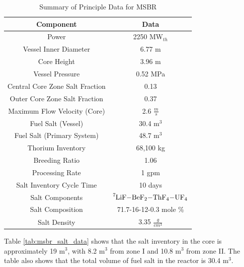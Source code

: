\begin{table}[H]
\renewcommand{\arraystretch}{1.25}
\caption{Summary of Principle Data for MSBR \cite{robertson_conceptual_1971}}
\label{tab:msbr_gen_data}
\begin{center}
\begin{tabular}{ c | c }
 \hline
 Component & Data\\
 \hline
 \hline
 Power & 2250 MW$_{th}$\\
 Vessel Inner Diameter & 6.77 m\\
 Core Height & 3.96 m\\
 Vessel Pressure & 0.52 MPa\\
 Central Core Zone Salt Fraction & 0.13\\
 Outer Core Zone Salt Fraction & 0.37\\
 Maximum Flow Velocity (Core) & 2.6 $\frac{m}{s}$\\
 Fuel Salt (Vessel) & 30.4 m$^3$\\
 Fuel Salt (Primary System) & 48.7 m$^3$\\
 Thorium Inventory & 68,100 kg\\
 Breeding Ratio & 1.06\\
 Processing Rate & 1 gpm\\
 Salt Inventory Cycle Time & 10 days\\
 Salt Components & $\ce{^{7}LiF-BeF_{2}-ThF_{4}-UF_{4}} $\\
 Salt Composition & 71.7-16-12-0.3 mole \% \\
 Salt Density & 3.35 $\frac{g}{cm^3}$\\
 \hline
\end{tabular}
\end{center}
\end{table}

Table \ref{tab:msbr_salt_data} shows that the salt inventory in the core is approximately 19 m$^3$, with 8.2 m$^3$ from zone I and 10.8 m$^3$ from zone II. The table also shows that the total volume of fuel salt in the reactor is 30.4 m$^3$.


